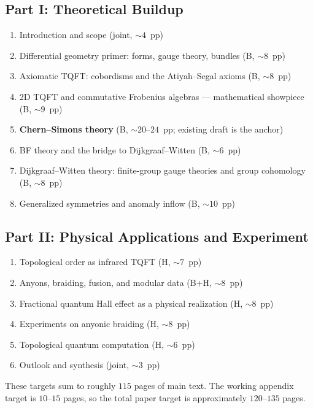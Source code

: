 \documentclass[11pt]{article}
\begin{document}
\subsection{Part I: Theoretical Buildup}

\begin{enumerate}[leftmargin=2em]
\item Introduction and scope (joint, $\sim 4$~pp)
\item Differential geometry primer: forms, gauge theory, bundles (B, $\sim 8$~pp)
\item Axiomatic TQFT: cobordisms and the Atiyah--Segal axioms (B, $\sim 8$~pp)
\item 2D TQFT and commutative Frobenius algebras --- mathematical showpiece (B, $\sim 9$~pp)
\item \textbf{Chern--Simons theory} (B, $\sim 20$--$24$~pp; existing draft is the anchor)
\item BF theory and the bridge to Dijkgraaf--Witten (B, $\sim 6$~pp)
\item Dijkgraaf--Witten theory: finite-group gauge theories and group cohomology (B, $\sim 8$~pp)
\item Generalized symmetries and anomaly inflow (B, $\sim 10$~pp)
\end{enumerate}

\subsection{Part II: Physical Applications and Experiment}

\begin{enumerate}[leftmargin=2em,start=9]
\item Topological order as infrared TQFT (H, $\sim 7$~pp)
\item Anyons, braiding, fusion, and modular data (B+H, $\sim 8$~pp)
\item Fractional quantum Hall effect as a physical realization (H, $\sim 8$~pp)
\item Experiments on anyonic braiding (H, $\sim 8$~pp)
\item Topological quantum computation (H, $\sim 6$~pp)
\item Outlook and synthesis (joint, $\sim 3$~pp)
\end{enumerate}

\noindent These targets sum to roughly $115$ pages of main text. The working appendix target is
$10$--$15$ pages, so the total paper target is approximately $120$--$135$ pages.
\end{document}
